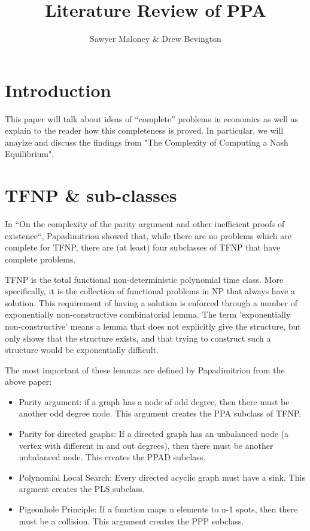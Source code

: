 \documentclass[10pt]{article}
\theoremstyle{definition}
\theoremstyle{remark}
\theoremstyle{definition}
\begin{document}
  

\author{Sawyer Maloney \& Drew Bevington}
\title{Literature Review of PPA}
\date{}

\maketitle

\pagestyle{empty}   
\thispagestyle{empty}

\section{Introduction}
This paper will talk about ideas of ``complete'' problems in economics as well as explain to the reader how
this completeness is proved. In particular, we will anaylze and discuss the findings from "The Complexity of Computing a Nash Equilibrium". 

\section{TFNP \& sub-classes}

In ``On the complexity of the parity argument and other inefficient proofs of existence``, Papadimitriou showed that, while there are no problems which are complete for TFNP, there are (at least) four subclasses of TFNP that have complete problems.

TFNP is the total functional non-deterministic polynomial time class. More specifically, it is the collection of functional problems in NP that always have a solution. This requirement of having a solution is enforced through a number of exponentially non-constructive combinatorial lemma. The term 'exponentially non-constructive' means a lemma that does not explicitly give the structure, but only shows that the structure exists, and that trying to construct such a structure would be exponentially difficult.

The most important of these lemmas are defined by Papadimitriou from the above paper:

\begin{itemize}
    \item Parity argument: if a graph has a node of odd degree, then there must be another odd degree node. This argument creates the PPA subclass of TFNP.
    \item Parity for directed graphs: If a directed graph has an unbalanced node (a vertex with different in and out degrees), then there must be another unbalanced node. This creates the PPAD subclass.
    \item Polynomial Local Search: Every directed acyclic graph must have a sink. This argment creates the PLS subclass.
    \item Pigeonhole Principle: If a function maps n elements to n-1 spots, then there must be a collision. This argument creates the PPP subclass.
\end{itemize}
\end{document}
